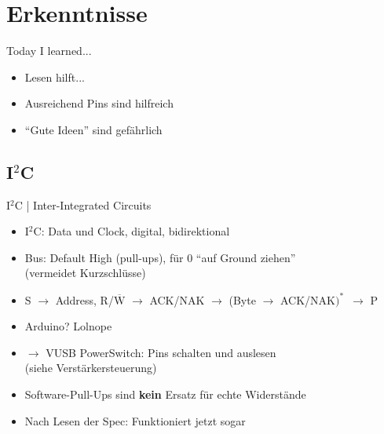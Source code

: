 \documentclass[compress]{beamer}
\begin{document}
\section{Erkenntnisse}
\begin{frame}{Today I learned...}
\begin{itemize}
\item Lesen hilft...
\item Ausreichend Pins sind hilfreich
\item "`Gute Ideen"' sind gefährlich
\end{itemize}
\end{frame}


\subsection{I$^2$C}
\begin{frame}{I$^2$C | Inter-Integrated Circuits}
\begin{itemize}
\item I$^2$C: Data und Clock, digital, bidirektional
\item Bus: Default High (pull-ups), für 0 "`auf Ground ziehen"'\\
{\small (vermeidet Kurzschlüsse)}
\item S $\to$ Address, R/$\overline{\text{W}}$ $\to$ ACK/NAK
$\to$ (Byte $\to$ ACK/NAK$)^*$\ $\to$ P
\end{itemize}
\begin{itemize}
\item Arduino? Lolnope
\item $\to$ VUSB PowerSwitch: Pins schalten und auslesen\\
{\small (siehe Verstärkersteuerung)}
\item Software-Pull-Ups sind \textbf{kein} Ersatz für echte
Widerstände
\item Nach Lesen der Spec: Funktioniert jetzt sogar
\end{itemize}
\end{frame}
\end{document}
